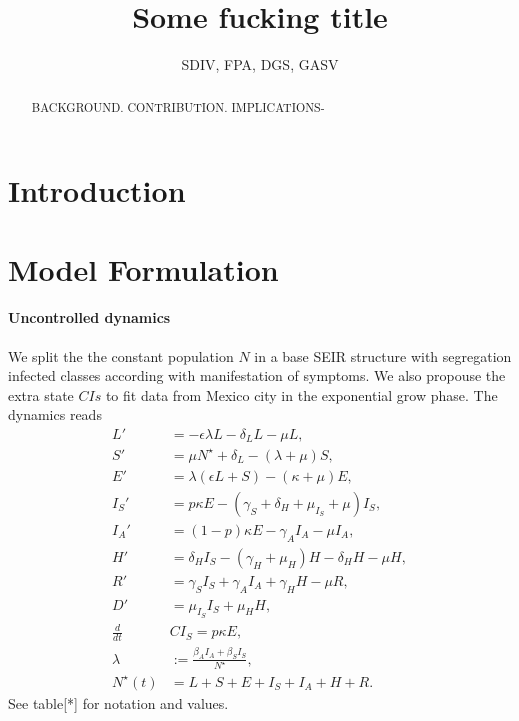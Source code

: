 \documentclass[a4paper,10pt]{amsart}
\begin{document}
    \author{SDIV, FPA, DGS, GASV}
    \title{Some fucking title}
    \maketitle

    \begin{abstract}
    	BACKGROUND.
    	CONTRIBUTION.
    	IMPLICATIONS-
    \end{abstract}

    \section{Introduction}
    \section{Model Formulation}
        \paragraph{Uncontrolled dynamics}
        We split the the constant population $N$ in a base SEIR structure
        with segregation infected classes according with manifestation  of symptoms.
        We also propouse the extra state $CIs$ to fit data from Mexico city
        in the exponential grow phase. The dynamics reads
        \begin{equation}
        	\label{eqn:base_dynamics}
            \begin{aligned}
            	L' & =
                	-\epsilon \lambda L - \delta_L L - \mu L,
            	\\
            	S' & =
                	\mu N^\star + \delta_L   - (\lambda + \mu) S,
            	\\
            	E' & =
                	\lambda (\epsilon L + S) - (\kappa + \mu) E,
            	\\
            	I_S' & =
                	p \kappa E - (\gamma_S + \delta_H + \mu_{I_S} + \mu) I_S,    
            	\\
            	I_A' &=
                	(1 - p) \kappa E - \gamma_A I_A - \mu I_A,
            	\\
            	H' &=
                	\delta_H I_S - (\gamma_H + \mu_H) H - \delta_H H - \mu H,
            	\\
            	R' & =
                	\gamma_S I_S + \gamma_A I_A + \gamma_H H - \mu R,
            	\\
            	D' &=
                	\mu_{I_S} I_S + \mu_H H,
            	\\
            	\frac{d}{dt} & C I_S = p \kappa E, 
            	\\
            	\lambda &:=
                	\frac{\beta_A I_A + \beta_S I_S}{N^{\star}},
            	\\
            	N^{\star}(t) &=
                	L + S + E + 
               	 	I_S + I_A +
                	H + R .
            \end{aligned}
        \end{equation}
         See table[*] for notation and values.
         
\end{document}
